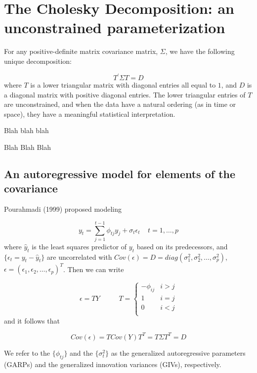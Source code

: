 
\chapter{The Cholesky Decomposition: an unconstrained parameterization}
\label{ch2.CholDecomposition}


For any positive-definite matrix covariance matrix, $\Sigma$, we have the following unique decomposition:

\begin{equation}
   T^\prime \Sigma T  = D
   \label{eq:MCD}
   \end{equation}
  \noindent 
where $T$ is a lower triangular matrix with diagonal entries all equal to $1$, and $D$ is a diagonal matrix with positive diagonal entries. The lower triangular entries of $T$ are unconstrained, and when the data have a natural ordering (as in time or space), they have a meaningful statistical interpretation. 

Blah blah blah

Blah Blah Blah

\section{An autoregressive model for elements of the covariance}

Pourahmadi (1999) proposed modeling

   \begin{equation}   
   y_t = \sum_{j=1}^{t-1} \phi_{tj} y_j + \sigma_t \epsilon_t \;\;\;\; t=1,\dots, p 
   \label{eq:Pourahmadimodel} 
   \end{equation}
   \noindent
where $\hat{y}_t$ is the least squares predictor of $y_t$ based on its predecessors, and $\lbrace \epsilon_t =  {y}_t - \hat{y}_t \rbrace$ are uncorrelated with $Cov\left(\epsilon\right) = D = diag\left( \sigma_1^2, \sigma_2^2, \dots, \sigma_p^2 \right)$, $\epsilon = \left(\epsilon_1, \epsilon_2, \dots, \epsilon_p \right)^T$. Then we can write

\[
\epsilon = TY\;\;\;\;\;\;\;\;\;\; T= \left\{ \begin{array}{cr}
-\phi_{ij} & i > j \\
1 & i = j \\
0 & i < j \\
\end{array} \right.
\]
and it follows that  

\[
Cov\left(\epsilon\right)  = T Cov\left( Y \right) T^T = T \Sigma T^T = D
\]

We refer to the $\lbrace \phi_{tj} \rbrace$ and the $\lbrace \sigma_t^2 \rbrace$ as the generalized autoregressive parameters (GARPs) and the generalized innovation variances (GIVs), respectively. 

